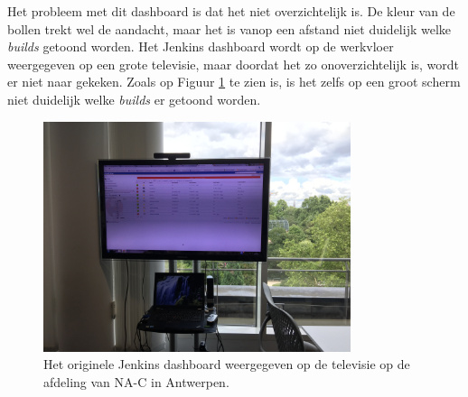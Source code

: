 \documentclass[10pt,a4paper]{article}
\begin{document}
Het probleem met dit dashboard is dat het niet overzichtelijk is. De kleur van de bollen trekt wel de aandacht, maar het is vanop een afstand niet duidelijk welke \textit{builds} getoond worden. Het Jenkins dashboard wordt op de werkvloer weergegeven op een grote televisie, maar doordat het zo onoverzichtelijk is, wordt er niet naar gekeken. Zoals op Figuur \ref{tv_1} te zien is, is het zelfs op een groot scherm niet duidelijk welke \textit{builds} er getoond worden.

\begin{figure}[ht!]
\centering
\includegraphics[width=90mm]{tvdashboardoriginal.jpg}
\caption{Het originele Jenkins dashboard weergegeven op de televisie op de afdeling van NA-C in Antwerpen.} 
\label{tv_1}
\end{figure}
\end{document}
